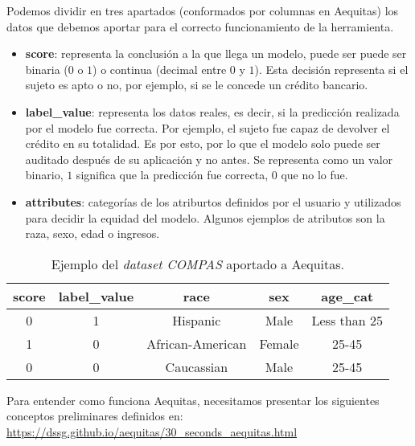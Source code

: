 Podemos dividir en tres apartados (conformados por columnas en Aequitas) los datos que debemos aportar para el correcto funcionamiento de la herramienta.

\begin{itemize}
    \item \textbf{score}: representa la conclusión a la que llega un modelo, puede ser puede ser binaria ($0$ o $1$) o continua (decimal entre $0$ y $1$). Esta decisión representa si el sujeto es apto o no, por ejemplo, si se le concede un crédito bancario.
    \item \textbf{label\_value}: representa los datos reales, es decir, si la predicción realizada por el modelo fue correcta. Por ejemplo, el sujeto fue capaz de devolver el crédito en su totalidad. Es por esto, por lo que el modelo solo puede ser auditado después de su aplicación y no antes. Se representa como un valor binario, $1$ significa que la predicción fue correcta, $0$ que no lo fue.
    \item \textbf{attributes}: categorías de los atriburtos definidos por el usuario y utilizados para decidir la equidad del modelo. Algunos ejemplos de atributos son la raza, sexo, edad o ingresos.
\end{itemize}

\begin{table}[h]
\centering
\resizebox{12.0cm}{!} {
\begin{tabular}{|c|c|c|c|c|}
\hline
\textbf{score} & \textbf{label\_value} & \textbf{race}    & \textbf{sex} & \textbf{age\_cat} \\ \hline
0              & 1                     & Hispanic         & Male         & Less than 25      \\ \hline
1              & 0                     & African-American & Female       & 25-45             \\ \hline
0              & 0                     & Caucassian       & Male         & 25-45             \\ \hline
\end{tabular}
}
\caption{Ejemplo del \textit{dataset COMPAS} aportado a Aequitas.}
\label{tab:ejcompasaeq}
\end{table}



Para entender como funciona Aequitas, necesitamos presentar los siguientes conceptos preliminares definidos en: \url{https://dssg.github.io/aequitas/30_seconds_aequitas.html}

